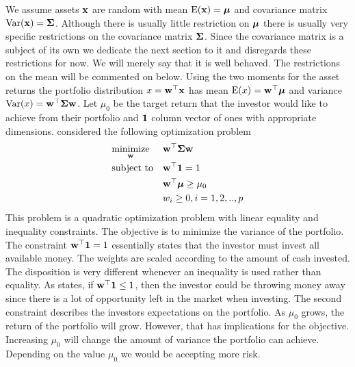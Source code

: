 \documentclass[]{book}\usepackage{knitr}
\begin{document}
We assume assets $\mathbf{x}$ are random with mean $\operatorname{E}(\mathbf{x})=\mbox{\boldmath$\mu$}$ and covariance matrix $\operatorname{Var}(\mathbf{x})=\mathbf{\Sigma}$. Although there is usually little restriction on $\mbox{\boldmath$\mu$}$ there is usually very specific restrictions on the covariance matrix $\mathbf{\Sigma}$. Since the covariance matrix is a subject of its own we dedicate the next section to it and disregards these restrictions for now. We will merely say that it is well behaved. The restrictions on the mean will be commented on below. Using the two moments for the asset returns the portfolio distribution $x = \mathbf{w}^\top \mathbf{x}$ has mean $\operatorname{E}(x)=\mathbf{w}^\top \mbox{\boldmath$\mu$}$ and variance $\operatorname{Var}(x)=\mathbf{w}^\top \mathbf{\Sigma} \mathbf{w}$. Let $\mu_0$ be the target return that the investor would like to achieve from their portfolio and $\mathbf{1}$ column vector of ones with appropriate dimensions. \citet{markowitz1959portfolio} considered the following optimization problem
\begin{equation}\label{eqn:markowitz_optim}
\begin{aligned}
& \underset{\mathbf{w}}{\text{minimize}} 
& & \mathbf{w}^\top \mathbf{\Sigma} \mathbf{w} \\
& \text{subject to}
& & \mathbf{w}^\top \mathbf{1} = 1 \\
& && \mathbf{w}^\top \mbox{\boldmath$\mu$} \geq \mu_0 \\
&&& w_i \geq 0, i=1,2,..,p
\end{aligned}
\end{equation}
This problem is a quadratic optimization problem with linear equality and inequality constraints. 
The objective is to minimize the variance of the portfolio. 
 The constraint $\mathbf{w}^\top \mathbf{1} = 1$ essentially states that the investor must invest all available money. 
The weights are scaled according to the amount of cash invested.
The disposition is very different whenever an inequality is used rather than equality. 
As \citet{hult2012risk} states, if $\mathbf{w}^\top \mathbf{1} \leq 1$, then the investor could be throwing money away since there is a lot of opportunity left in the market when investing.
The second constraint describes the investors expectations on the portfolio. 
As $\mu_0$ grows, the return of the portfolio will grow. 
However, that has implications for the objective. 
Increasing $\mu_0$ will change the amount of variance the portfolio can achieve. 
Depending on the value $\mu_0$ we would be accepting more risk. 
\end{document}
